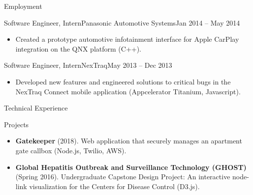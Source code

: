 \documentclass[]{mcdowellcv}
\begin{document}
\begin{cvsection}{Employment}
		\begin{cvsubsection}{Software Engineer, Intern}{Panasonic Automotive Systems}{Jan 2014 -- May 2014}
			\begin{itemize}
				\item Created a prototype automotive infotainment interface for Apple CarPlay integration on the QNX platform (C++).
			\end{itemize}
		\end{cvsubsection}

		\begin{cvsubsection}{Software Engineer, Intern}{NexTraq}{May 2013 -- Dec 2013}
			\begin{itemize}
				\item Developed new features and engineered solutions to critical bugs in the NexTraq Connect mobile application (Appcelerator Titanium, Javascript).
			\end{itemize}
		\end{cvsubsection}
	\end{cvsection}
	
	\begin{cvsection}{Technical Experience}
		\begin{cvsubsection}{Projects}{}{}
			\begin{itemize}
				\item \textbf{Gatekeeper} (2018). Web application that securely manages an apartment gate callbox (Node.js, Twilio, AWS).
				\item \textbf{Global Hepatitis Outbreak and Surveillance Technology (GHOST)} (Spring 2016). Undergraduate Capstone Design Project: An interactive node-link visualization for the Centers for Disease Control (D3.js).
			\end{itemize}
		\end{cvsubsection}
	\end{cvsection}
	
\end{document}
